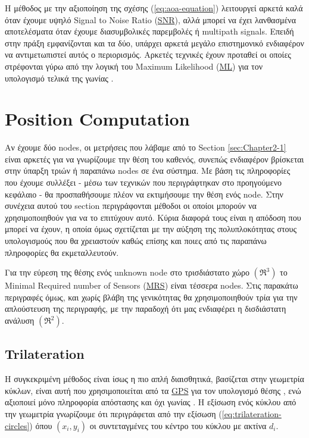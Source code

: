 Η μέθοδος με την αξιοποίηση της σχέσης (\ref{eq:aoa-equation}) λειτουργεί αρκετά καλά όταν έχουμε υψηλό Signal to Noise Ratio (\hyperref[abbr:SNR]{SNR}),
αλλά μπορεί να έχει λανθασμένα αποτελέσματα όταν έχουμε διασυμβολικές παρεμβολές ή multipath signals. 
Επειδή στην πράξη εμφανίζονται και τα δύο, υπάρχει αρκετά μεγάλο επιστημονικό ενδιαφέρον να αντιμετωπιστεί αυτός ο περιορισμός.
Αρκετές τεχνικές έχουν προταθεί οι οποίες στρέφονται γύρω από την λογική του Maximum Likelihood (\hyperref[abbr:ML]{ML})
για τον υπολογισμό τελικά της γωνίας \cite{wsn-Localization-techniques}.

\section{Position Computation} \label{sec:Chapter2-2} 
Αν έχουμε δύο nodes, οι μετρήσεις που λάβαμε από το Section \ref{sec:Chapter2-1} είναι αρκετές για να γνωρίζουμε την θέση του καθενός,
συνεπώς ενδιαφέρον βρίσκεται στην ύπαρξη τριών ή παραπάνω nodes σε ένα σύστημα. Με βάση τις πληροφορίες που έχουμε συλλέξει - μέσω των τεχνικών που 
περιγράφτηκαν στο προηγούμενο κεφάλαιο - θα προσπαθήσουμε πλέον να εκτιμήσουμε την θέση ενός node. Στην συνέχεια αυτού του section περιγράφονται μέθοδοι οι οποίοι μπορούν να χρησιμοποιηθούν για να το επιτύχουν
αυτό. Κύρια διαφορά τους είναι η απόδοση που μπορεί να έχουν, η οποία όμως σχετίζεται με την αύξηση της πολυπλοκότητας στους υπολογισμούς που θα
χρειαστούν καθώς επίσης και ποιες από τις παραπάνω πληροφορίες θα εκμεταλλευτούν. 

Για την εύρεση της θέσης ενός unknown node στο τρισδιάστατο χώρο $(\mathfrak{R}^3)$ το Minimal Required number of Sensors (\hyperref[abbr:MRS]{MRS}) είναι τέσσερα nodes.
Στις παρακάτω περιγραφές όμως, και χωρίς βλάβη της γενικότητας θα χρησιμοποιηθούν τρία για την απλούστευση της περιγραφής, με την παραδοχή ότι μας
ενδιαφέρει η δισδιάστατη ανάλυση $(\mathfrak{R}^2)$.

\subsection{Trilateration}
Η συγκεκριμένη μέθοδος είναι ίσως η πιο απλή διαισθητικά, βασίζεται στην γεωμετρία κύκλων, είναι αυτή που χρησιμοποιείται από τα \hyperref[abbr:GPS]{GPS}
για τον υπολογισμό θέσης \cite{trilateration-vs-triangulation-video}, ενώ αξιοποιεί μόνο πληροφορία απόστασης και όχι γωνίας \cite{Trilateration-vs-Triangulation}.
Η εξίσωση ενός κύκλου από την γεωμετρία γνωρίζουμε ότι περιγράφεται από την εξίσωση (\ref{eq:trilateration-circles}) όπου $(x_i,y_i)$ οι συντεταγμένες
του κέντρο του κύκλου με ακτίνα $d_i$.


